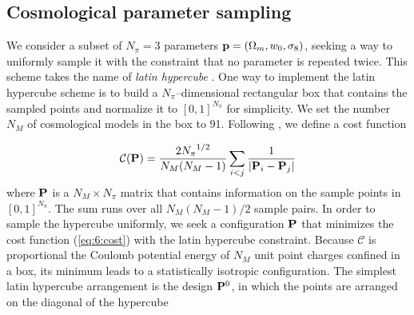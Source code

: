\subsection{Cosmological parameter sampling}
\label{sec:6:sampling}
We consider a subset of $N_\pi=3$ parameters $\mathbf{p}=(\Omega_m,w_0,\sigma_8)$, seeking a way to uniformly sample it with the constraint that no parameter is repeated twice. This scheme takes the name of \textit{latin hypercube} \citep{Coyote2}. One way to implement the latin hypercube scheme is to build a $N_\pi$--dimensional rectangular box that contains the sampled points and normalize it to $[0,1]^{N_\pi}$ for simplicity. We set the number $N_M$ of cosmological models in the box to 91. Following \citep{Coyote2,PetriCFHTMink}, we define a cost function 

\begin{equation}
\label{eq:6:cost}
\mathcal{C}(\mathbf{P}) = \frac{2{N_\pi}^{1/2}}{N_M(N_M-1)}\sum_{i<j} \frac{1}{\vert \mathbf{P}_i-\mathbf{P}_j \vert}
\end{equation} 
%
where $\mathbf{P}$ is a $N_M\times N_\pi$ matrix that contains information on the sample points in $[0,1]^{N_\pi}$. The sum runs over all $N_M(N_M-1)/2$ sample pairs. In order to sample the hypercube uniformly, we seek a configuration $\mathbf{P}$ that minimizes the cost function (\ref{eq:6:cost}) with the latin hypercube constraint. Because $\mathcal{C}$ is proportional the Coulomb potential energy of $N_M$ unit point charges confined in a box, its minimum leads to a statistically isotropic configuration. The simplest latin hypercube arrangement is the design $\mathbf{P}^0$, in which the points are arranged on the diagonal of the hypercube

